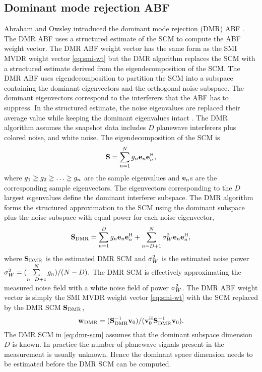 \subsection{Dominant mode rejection ABF}
\label{sec:dmr-abf}
Abraham and Owsley introduced the dominant mode rejection (DMR) ABF
\cite{abraham1990beamforming}. The DMR ABF uses a structured estimate
of the SCM to compute the ABF weight vector. The DMR ABF weight vector
has the same form as the SMI MVDR weight vector \eqref{eq:smi-wt} but
the DMR algorithm replaces the SCM with a structured estimate derived
from the eigendecomposition of the SCM. The DMR ABF uses
eigendecomposition to partition the SCM into a subspace containing the
dominant eigenvectors and the orthogonal noise subspace. The dominant
eigenvectors correspond to the interferers that the ABF has to
suppress. In the structured estimate, the noise eigenvalues are
replaced their average value while keeping the dominant eigenvalues intact \cite{vtree2002oap}.
\clearpage
The DMR algorithm assumes the snapshot data includes $D$ planewave
interferers plus colored noise, and white noise. The
eigendecomposition of the SCM is
\[
{\bf S} = \sum\limits_{n = 1}^{N}g_n{\bf e}_n{\bf e}_n^{\rm H},
\]
where $g_1 \geq g_2 \geq \ldots \geq g_n$ are
the sample eigenvalues and ${\bf e}_n$s are the corresponding sample
eigenvectors. The eigenvectors corresponding to the $D$ largest
eigenvalues define the dominant interferer subspace. The DMR algorithm
forms the structured approximation to the SCM using the dominant
subspace plus the noise subspace with equal power for each noise
eigenvector,
\begin{equation}
  \label{eq:dmr-scm}
{\bf S}_{\rm DMR} = \sum\limits_{n = 1}^{D} g_n{\bf e}_n{\bf e}_n^{\rm H} + \sum\limits_{n = D + 1}^{N} \sigma^2_W{\bf e}_n{\bf e}_n^{\rm H},
\end{equation}
where ${\bf S}_{\rm DMR}$ is the estimated DMR SCM and $\sigma^2_W$ is the
estimated noise power $ \sigma^2_W = (\sum\limits_{n = D + 1}^{N}g_n)/(N- D).$
The DMR SCM is effectively approximating the measured noise field with
a white noise field of power $\sigma^2_W$.  The DMR ABF weight vector is simply
the SMI MVDR weight vector \eqref{eq:smi-wt} with the SCM replaced by
the DMR SCM ${\bf S}_{\rm DMR}$,
\[
{\bf w}_{\rm DMR} = ({\bf S}_{\rm DMR}^{-1}{\bf v}_0)/({\bf v}_0^{\rm H}{\bf S}_{\rm DMR}^{-1}{\bf v}_0).
\]
The DMR SCM in \eqref{eq:dmr-scm} assumes that the dominant subspace dimension $D$ is known. In practice the number of planewave signals present in the measurement is usually unknown. Hence the dominant space dimension needs to be estimated before the DMR SCM can be computed.

